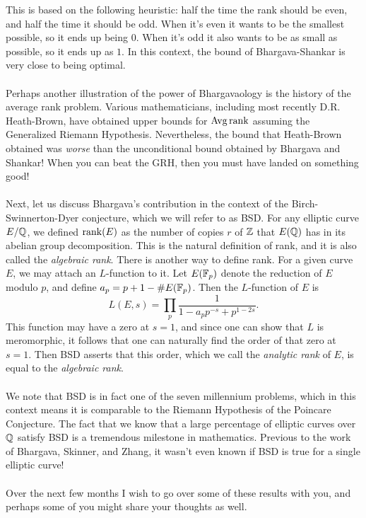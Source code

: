 \documentclass[12pt,amsfont]{amsart}
\begin{document}
This is based on the following heuristic: half the time the rank should be even, and half the time it should be odd. When it's even it wants to be the smallest possible, so it ends up being $0$. When it's odd it also wants to be as small as possible, so it ends up as $1$. In this context, the bound of Bhargava-Shankar is very close to being optimal. \\ \\
Perhaps another illustration of the power of Bhargavaology is the history of the average rank problem. Various mathematicians, including most recently D.R. Heath-Brown, have obtained upper bounds for $\operatorname{Avg} \operatorname{rank}$ assuming the Generalized Riemann Hypothesis. Nevertheless, the bound that Heath-Brown obtained was \emph{worse} than the unconditional bound obtained by Bhargava and Shankar! When you can beat the GRH, then you must have landed on something good! \\ \\
Next, let us discuss Bhargava's contribution in the context of the Birch-Swinnerton-Dyer conjecture, which we will refer to as BSD. For any elliptic curve $E/{\mathbb Q}$, we defined $\operatorname{rank}(E)$ as the number of copies $r$ of ${\mathbb Z}$ that $E({\mathbb Q})$ has in its abelian group decomposition. This is the natural definition of rank, and it is also called the \emph{algebraic rank}. There is another way to define rank. For a given curve $E$, we may attach an $L$-function to it. Let $E({\mathbb F}_p)$ denote the reduction of $E$ modulo $p$, and define $a_p = p + 1 - \# E({\mathbb F}_p)$. Then the $L$-function of $E$ is
\[L(E,s) = \prod_p \frac{1}{1 - a_p p^{-s} + p^{1 - 2s}}.\]
This function may have a zero at $s = 1$, and since one can show that $L$ is meromorphic, it follows that one can naturally find the order of that zero at $s = 1$. Then BSD asserts that this order, which we call the \emph{analytic rank} of $E$, is equal to the \emph{algebraic rank}. \\ \\
We note that BSD is in fact one of the seven millennium problems, which in this context means it is comparable to the Riemann Hypothesis of the Poincare Conjecture. The fact that we know that a large percentage of elliptic curves over ${\mathbb Q}$ satisfy BSD is a tremendous milestone in mathematics. Previous to the work of Bhargava, Skinner, and Zhang, it wasn't even known if BSD is true for a single elliptic curve! \\ \\
Over the next few months I wish to go over some of these results with you, and perhaps some of you might share your thoughts as well. 
\end{document}
